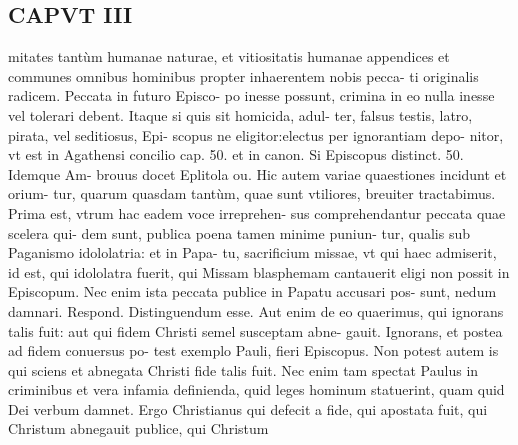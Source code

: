 \documentclass{article}
\begin{document}
\begin{pages}
\section*{CAPVT  III }
\marginpar{[ p.103 ]}\pstart mitates tantùm humanae naturae, et vitiositatis humanae appendices et communes omnibus hominibus propter inhaerentem nobis pecca- ti originalis radicem. Peccata in futuro Episco- po inesse possunt, crimina in eo nulla inesse vel tolerari debent. Itaque si quis sit homicida, adul- ter, falsus testis, latro, pirata, vel seditiosus, Epi- scopus ne eligitor:electus per ignorantiam depo- nitor, vt est in Agathensi concilio cap. 50. et in canon. Si Episcopus distinct. 50. Idemque Am- brouus docet Eplitola ou.  \pend\pstart Hic autem variae quaestiones incidunt et orium- tur, quarum quasdam tantùm, quae sunt vtiliores, breuiter tractabimus.  \pend\pstart Prima est, vtrum hac eadem voce irreprehen- sus comprehendantur peccata quae scelera qui- dem sunt, publica poena tamen minime puniun- tur, qualis sub Paganismo idololatria: et in Papa- tu, sacrificium missae, vt qui haec admiserit, id est, qui idololatra fuerit, qui Missam blasphemam cantauerit eligi non possit in Episcopum. Nec enim ista peccata publice in Papatu accusari pos- sunt, nedum damnari. Respond. Distinguendum esse. Aut enim de eo quaerimus, qui ignorans talis fuit: aut qui fidem Christi semel susceptam abne- gauit. Ignorans, et postea ad fidem conuersus po- test exemplo Pauli, fieri Episcopus. Non potest autem is qui sciens et abnegata Christi fide talis fuit. Nec enim tam spectat Paulus in criminibus et vera infamia definienda, quid leges hominum statuerint, quam quid Dei verbum damnet. Ergo Christianus qui defecit a fide, qui apostata fuit, qui Christum abnegauit publice, qui Christum  \pend

\end{pages}
\end{document}
